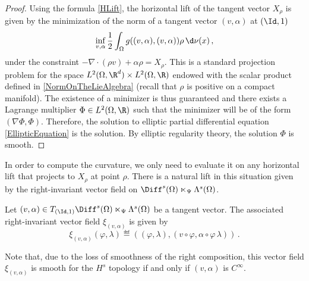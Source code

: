 \begin{proof}
Using the formula \eqref{HLift}, the horizontal lift of the tangent vector $X_\rho$ is given by the minimization of the norm of a tangent vector $(v,\alpha)$ at $(\Id,1)$
\begin{equation}\label{NormOnTheLieAlgebra}
\inf_{v,\alpha} \frac{1}{2} \int_{\Omega} g((v,\alpha),(v,\alpha)) \rho \, \d \nu(x) \,,
\end{equation}
under the constraint $-\nabla \cdot (\rho v)  + \alpha \rho = X_\rho$.
This is a standard projection problem for the space $L^2(\Omega,\R^d) \times L^2(\Omega,\R)$ endowed with the scalar product defined in \eqref{NormOnTheLieAlgebra} (recall that $\rho$ is positive on a compact manifold). The existence of a minimizer is thus guaranteed and there exists a Lagrange multiplier $\Phi \in L^2(\Omega,\R)$ such that the minimizer will be of the form $(\nabla \Phi,\Phi)$. Therefore, the solution to elliptic partial differential equation \eqref{EllipticEquation} is the solution. By elliptic regularity theory, the solution $\Phi$ is smooth.
\end{proof}
In order to compute the curvature, we only need to evaluate it on any horizontal lift that projects to $X_\rho$ at point $\rho$. There is a natural lift in this situation given by the right-invariant vector field on $\Diff^{s}(\Omega) \ltimes_\Psi \Lambda^s(\Omega)$.
\begin{definition}
Let $(v,\alpha) \in T_{(\Id,1)}\Diff^{s}(\Omega) \ltimes_\Psi \Lambda^s(\Omega)$ be a tangent vector. The associated right-invariant vector field $\xi_{(v,\alpha)}$ is given by 
\begin{equation}
\xi_{(v,\alpha)}(\varphi,\lambda) \eqdef \left( (\varphi,\lambda) , (v \circ \varphi, \alpha \circ \varphi \, \lambda) \right)\,.
\end{equation} 
\end{definition}
\begin{remark}
Note that, due to the loss of smoothness of the right composition, this vector field $\xi_{(v,\alpha)}$ is smooth for the $H^s$ topology if and only if $(v,\alpha)$ is $C^\infty$.
\end{remark}
